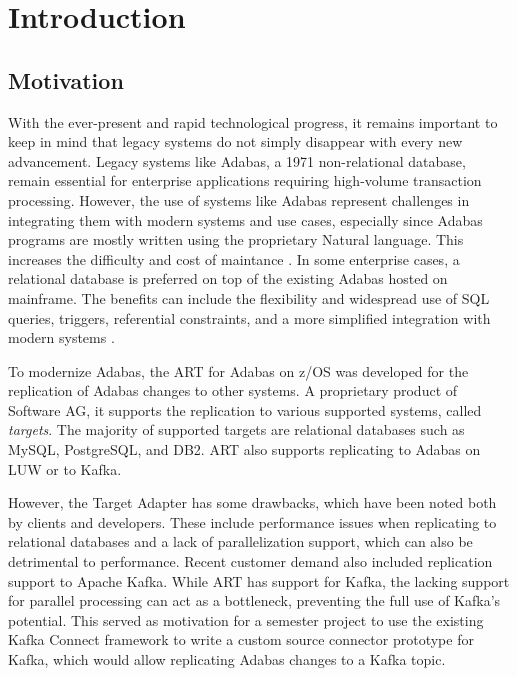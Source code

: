 \chapter{Introduction}
\label{ch01:intro}

\section{Motivation}
\label{ch01:intro:motivation}
With the ever-present and rapid technological progress, it remains important to keep in mind that legacy systems do not simply disappear with every new advancement. Legacy systems like Adabas, a 1971 non-relational database, remain essential for enterprise applications requiring high-volume transaction processing. However, the use of systems like Adabas represent challenges in integrating them with modern systems and use cases, especially since Adabas programs are mostly written using the proprietary Natural language. This increases the difficulty and cost of maintance \cite{ibm_redpaper_key}. In some enterprise cases, a relational database is preferred on top of the existing Adabas hosted on mainframe. The benefits can include the flexibility and widespread use of SQL queries, triggers, referential constraints, and a more simplified integration with modern systems \cite{ibm_redpaper_key}.

To modernize Adabas, the \ac{ART} for Adabas on z/OS was developed for the replication of Adabas changes to other systems. A proprietary product of Software AG, it supports the replication to various supported systems, called \textit{targets}. The majority of supported targets are relational databases such as MySQL, PostgreSQL, and DB2. \ac{ART} also supports replicating to Adabas on \ac{LUW} or to Kafka. %

However, the Target Adapter has some drawbacks, which have been noted both by clients and developers. These include performance issues when replicating to relational databases and a lack of parallelization support, which can also be detrimental to performance. Recent customer demand also included replication support to Apache Kafka. While \ac{ART} has support for Kafka, the lacking support for parallel processing can act as a bottleneck, preventing the full use of Kafka's potential. This served as motivation for a semester project to use the existing Kafka Connect framework to write a custom source connector prototype for Kafka, which would allow replicating Adabas changes to a Kafka topic.

